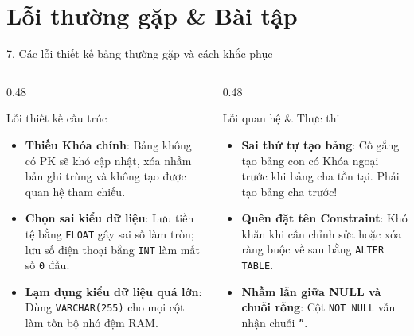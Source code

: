 \documentclass[aspectratio=169,11pt]{beamer}
\begin{document}
\section{Lỗi thường gặp \& Bài tập}
\begin{frame}{7. Các lỗi thiết kế bảng thường gặp và cách khắc phục}
\begin{columns}[t]
  \begin{column}{0.48\textwidth}
    \begin{alertblock}{Lỗi thiết kế cấu trúc}
      \begin{itemize}\setlength{\itemsep}{2pt}
        \item \textbf{Thiếu Khóa chính}: Bảng không có PK sẽ khó cập nhật, xóa nhầm bản ghi trùng và không tạo được quan hệ tham chiếu.
        \item \textbf{Chọn sai kiểu dữ liệu}: Lưu tiền tệ bằng \texttt{FLOAT} gây sai số làm tròn; lưu số điện thoại bằng \texttt{INT} làm mất số \texttt{0} đầu.
        \item \textbf{Lạm dụng kiểu dữ liệu quá lớn}: Dùng \texttt{VARCHAR(255)} cho mọi cột làm tốn bộ nhớ đệm RAM.
      \end{itemize}
    \end{alertblock}
  \end{column}
  \begin{column}{0.48\textwidth}
    \begin{alertblock}{Lỗi quan hệ \& Thực thi}
      \begin{itemize}\setlength{\itemsep}{2pt}
        \item \textbf{Sai thứ tự tạo bảng}: Cố gắng tạo bảng con có Khóa ngoại trước khi bảng cha tồn tại. Phải tạo bảng cha trước!
        \item \textbf{Quên đặt tên Constraint}: Khó khăn khi cần chỉnh sửa hoặc xóa ràng buộc về sau bằng \texttt{ALTER TABLE}.
        \item \textbf{Nhầm lẫn giữa NULL và chuỗi rỗng}: Cột \texttt{NOT NULL} vẫn nhận chuỗi \texttt{''}.
      \end{itemize}
    \end{alertblock}
  \end{column}
\end{columns}
\end{frame}
\end{document}
